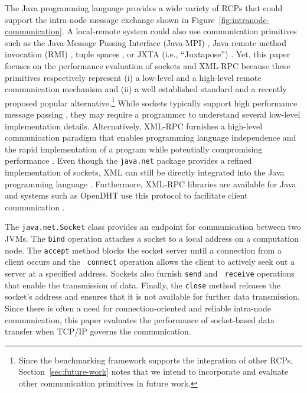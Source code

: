 \documentclass{sig-alternate}
\begin{document}
The Java programming language provides a wide variety of RCPs that
could support the intra-node message exchange shown in
Figure~\ref{fig:intranode-communication}.  A local-remote system could
also use communication primitives such as the Java-Message Passing
Interface (Java-MPI) \cite{getov-mpi,judd-mpi-java}, Java remote
method invocation (RMI) \cite{grosso-rmi,maasen-java-rmi}, tuple
spaces \cite{arnold-javaspace-rdb,wells-linda-java-journal}, or JXTA
(i.e., ``Juxtapose'') \cite{oaks-jxta,seigneur-jxta}.  Yet, this paper
focuses on the performance evaluation of sockets and XML-RPC because
these primitives respectively represent (i) a low-level and a
high-level remote communication mechanism and (ii) a well established
standard and a recently proposed popular alternative.\footnote{{\small
    Since the benchmarking framework supports the integration of other
    RCPs, Section~\ref{sec:future-work} notes that we intend to
    incorporate and evaluate other communication primitives in future
    work.}} While sockets typically support high performance message
passing \cite{allman-per}, they may require a programmer to understand
several low-level implementation details.  Alternatively, XML-RPC
furnishes a high-level communication paradigm that enables programming
language independence and the rapid implementation of a program while
potentially compromising performance \cite{allman-per}.  Even though
the {\tt java.net} package provides a refined implementation of
sockets, XML can still be directly integrated into the Java
programming language \cite{harren-xj}.  Furthermore, XML-RPC libraries
are available for Java and systems such as OpenDHT use this protocol
to facilitate client communication \cite{rhea-opendht}.

The {\tt java.net.Socket} class provides an endpoint for communication
between two JVMs.  The {\tt bind} operation attaches a socket to a
local address on a computation node.  The {\tt accept} method blocks
the socket server until a connection from a client occurs and the {\tt
  connect} operation allows the client to actively seek out a server
at a specified address.  Sockets also furnish {\tt send} and {\tt
  receive} operations that enable the transmission of data.  Finally,
the {\tt close} method releases the socket's address and ensures that
it is not available for further data transmission.  Since there is
often a need for connection-oriented and reliable intra-node
communication, this paper evaluates the performance of socket-based
data transfer when TCP/IP governs the communication.
\end{document}

